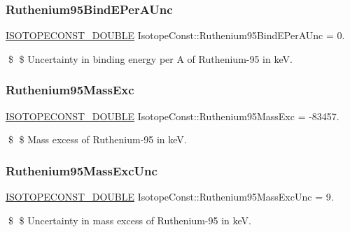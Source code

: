 \subsubsection{\texorpdfstring{Ruthenium95\+Bind\+E\+Per\+A\+Unc}{Ruthenium95BindEPerAUnc}}
{\footnotesize\ttfamily \mbox{\hyperlink{group___isotope_const-_macros_ga8f45a7272ce02c0b4c65c44636ed719a}{I\+S\+O\+T\+O\+P\+E\+C\+O\+N\+S\+T\+\_\+\+D\+O\+U\+B\+LE}} Isotope\+Const\+::\+Ruthenium95\+Bind\+E\+Per\+A\+Unc = 0.}

\$ \$ Uncertainty in binding energy per A of Ruthenium-\/95 in keV. \mbox{\label{group___isotope_const-_ruthenium-_ru95_gafc8eb5bad153fc9be02dcd8e205e2d5f}} 
\subsubsection{\texorpdfstring{Ruthenium95\+Mass\+Exc}{Ruthenium95MassExc}}
{\footnotesize\ttfamily \mbox{\hyperlink{group___isotope_const-_macros_ga8f45a7272ce02c0b4c65c44636ed719a}{I\+S\+O\+T\+O\+P\+E\+C\+O\+N\+S\+T\+\_\+\+D\+O\+U\+B\+LE}} Isotope\+Const\+::\+Ruthenium95\+Mass\+Exc = -\/83457.}

\$ \$ Mass excess of Ruthenium-\/95 in keV. \mbox{\label{group___isotope_const-_ruthenium-_ru95_gae7c35138c4ac674c57aee0d4abfad708}} 
\subsubsection{\texorpdfstring{Ruthenium95\+Mass\+Exc\+Unc}{Ruthenium95MassExcUnc}}
{\footnotesize\ttfamily \mbox{\hyperlink{group___isotope_const-_macros_ga8f45a7272ce02c0b4c65c44636ed719a}{I\+S\+O\+T\+O\+P\+E\+C\+O\+N\+S\+T\+\_\+\+D\+O\+U\+B\+LE}} Isotope\+Const\+::\+Ruthenium95\+Mass\+Exc\+Unc = 9.}

\$ \$ Uncertainty in mass excess of Ruthenium-\/95 in keV. \mbox{\label{group___isotope_const-_ruthenium-_ru95_gaf184b7d1f121ce279acada6c4646b54e}} 
